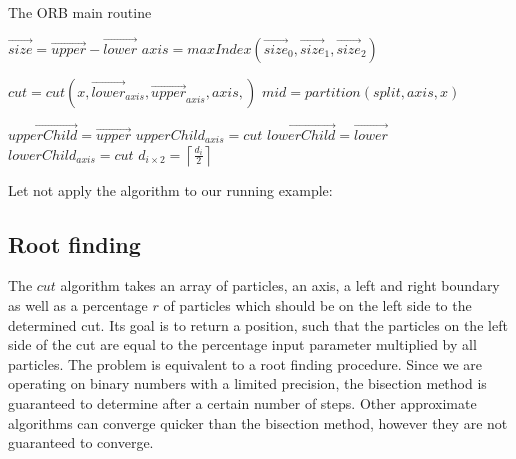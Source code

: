 \documentclass[]{article}
\begin{document}
\begin{algorithm}[H]
	\caption{The ORB main routine}\label{euclid}
	\begin{algorithmic}[1]
		\State $\vec{size} = \vec{upper} - \vec{lower}$
		\State $axis = maxIndex(\vec{size}_0, \vec{size}_1, \vec{size}_2)$ 
		\newline
		
		\State $cut = cut(x, \vec{lower}_{axis}, \vec{upper}_{axis}, axis, )$
		\State $mid = partition(split, axis, x)$
		\newline
		
		\State $\vec{upperChild} = \vec{upper}$
		\State $upperChild_{axis} = cut$
		\State $\vec{lowerChild} = \vec{lower}$
		\State $lowerChild_{axis} = cut$
		\State $d_{i \times 2 } = \left \lceil\frac{d_{i}}{2} \right \rceil$
		\State {}
		\EndProcedure
	\end{algorithmic}
\end{algorithm}

Let not apply the algorithm to our running example:


\subsection{Root finding}



 The $cut$ algorithm takes an array of particles, an axis, a left and right boundary as well as a percentage $r$ of particles which should be on the left side to the determined cut. Its goal is to return a position, such that the particles on the left side of the cut are equal to the percentage input parameter multiplied by all particles. The problem is equivalent to a root finding procedure. Since we are operating on binary numbers with a limited precision, the bisection method is guaranteed to determine after a certain number of steps. 
 Other approximate algorithms can converge quicker than the bisection method, however they are not guaranteed to converge.
\end{document}
